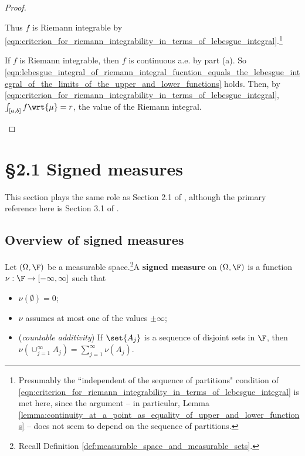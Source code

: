 \documentclass{article} %
\newcommand{\dmu}{\wrt{\mu}}
\begin{document}
\begin{proof}
\begin{alphabate}
\begin{itemize}
Thus $f$ is Riemann integrable by \eqref{eqn:criterion_for_riemann_integrability_in_terms_of_lebesgue_integral}.\footnote{Presumably the ``independent of the sequence of partitions" condition of \eqref{eqn:criterion_for_riemann_integrability_in_terms_of_lebesgue_integral} is met here, since the argument -- in particular, Lemma  \ref{lemma:continuity_at_a_point_as_equality_of_upper_and_lower_functions} -- does not seem to depend on the sequence of partitions.}
\end{itemize}
\item If $f$ is Riemann integrable, then $f$ is continuous a.e. by part (a).   So \eqref{eqn:lebesgue_integral_of_riemann_integral_fucntion_equals_the_lebesgue_integral_of_the_limits_of_the_upper_and_lower_functions} holds.  Then, by \eqref{eqn:criterion_for_riemann_integrability_in_terms_of_lebesgue_integral}, $\int_{[a,b]} f \dmu = r$, the value of the Riemann integral. 
\end{alphabate}
\end{proof}

\section{\S 2.1 Signed measures} \label{sec:signed_measures}

This section plays the same role as Section 2.1 of \cite{ash2000probability}, although the primary reference here is Section 3.1 of \cite{folland1999real}.

\subsection{Overview of signed measures}



\begin{definition} Let $(\Omega,\F)$ be a measurable space.\footnote{Recall Definition \ref{def:measurable_space_and_measurable_sets}.}A \textbf{signed measure} on $(\Omega,\F)$ is a function $\nu : \F \to [-\infty, \infty]$ such that
\begin{itemize}
\item $\nu(\emptyset) = 0$;
\item $\nu$ assumes at most one of the values $\pm \infty$;
\item (\textit{countable additivity}) If $\set{A_j}$ is a sequence of disjoint sets in $\F$, then $\nu(\cup_{j=1}^\infty A_j) = \sum_{j=1}^\infty \nu(A_j)$.
\end{itemize}
\label{def:signed_measure}
\end{definition}
\end{document}
